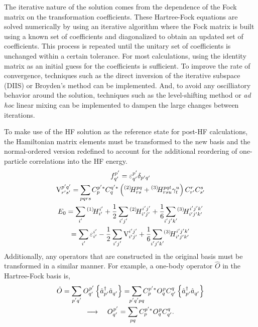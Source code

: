 \documentclass[thesis.tex]{subfiles}
\begin{document}
The iterative nature of the solution comes from the dependence of the Fock matrix on the transformation coefficients. These Hartree-Fock equations are solved numerically by using an iterative algorithm where the Fock matrix is built using a known set of coefficients and diagonalized to obtain an updated set of coefficients.  This process is repeated until the unitary set of coefficients is unchanged within a certain tolerance.  For most calculations, using the identity matrix as an initial guess for the coefficients is sufficient.  To improve the rate of convergence, techniques such as the direct inversion of the iterative subspace (DIIS) \cite{PULAY1980393,PULAY1982556} or Broyden's method \cite{BROYDEN1965557} can be implemented.  And, to avoid any oscilliatory behavior around the solution, techniques such as the level-shifting method or \textit{ad hoc} linear mixing can be implemented to dampen the large changes between iterations.

To make use of the HF solution as the reference state for post-HF calculations, the Hamiltonian matrix elements must be transformed to the new basis and the normal-ordered version redefined to account for the additional reordering of one-particle correlations into the HF energy.
\begin{gather}
  \fint{p'}{q'} = \varepsilon^{p'}_{q'}\delta_{p'q'} \\
  \vint{p'q'}{r's'} = \sum_{\mathclap{pqrs}} C^{p'*}_{p}C^{q'*}_{q}\left(\Hint{2}{pq}{rs} + \Hint{3}{pqt}{rsu}\gamma^{u}_{t}\right)C^{r}_{r'}C^{s}_{s'} \\
  E_{0} = \sum_{\mathclap{i'}}\Hint{1}{i'}{i'} + \frac{1}{2}\sum_{\mathclap{i'j'}}\Hint{2}{i'j'}{i'j'} + \frac{1}{6}\sum_{\mathclap{i'j'k'}}\Hint{3}{i'j'k'}{i'j'k'} \notag \\
  = \sum_{\mathclap{i'}}\varepsilon^{i'}_{i'} - \frac{1}{2}\sum_{\mathclap{i'j'}}\vint{i'j'}{i'j'} + \frac{1}{6}\sum_{\mathclap{i'j'k'}}\Hint{3}{i'j'k'}{i'j'k'}
\end{gather}
Additionally, any operators that are constructed in the original basis must be transformed in a similar manner.  For example, a one-body operator $\hat{O}$ in the Hartree-Fock basis is,
\begin{gather}
  \hat{O} = \sum_{\mathclap{p'q'}}\opint{}{p'}{q'}\normord{\co{p'}\ao{q'}} = \sum_{\mathclap{p'q'pq}}C^{p'*}_{p}\opint{}{p}{q}C^{q}_{q'}\normord{\co{p'}\ao{q'}} \notag \\
  \longrightarrow\ \ \ \opint{}{p'}{q'} = \sum_{\mathclap{pq}}C^{p'*}_{p}\opint{}{p}{q}C^{q}_{q'}.
\end{gather}
\end{document}
